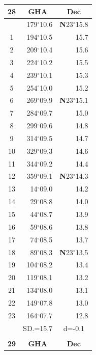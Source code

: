 \documentclass[10pt, a4paper]{report}
\begin{document}
\begin{scriptsize}
\begin{tabular*}{0.2\textwidth}[t]{@{\extracolsep{\fill}}|c|rr|}
\hline
\multicolumn{1}{|c|}{\rule{0pt}{2.6ex}\textbf{28}} & \multicolumn{1}{c}{\textbf{GHA}} & \multicolumn{1}{c|}{\textbf{Dec}}\\
\hline\rule{0pt}{2.6ex}\noindent
0 & 179$^\circ$10.6 & \textbf{N}23$^\circ$15.8\\
1 & 194$^\circ$10.5 & 15.7\\
2 & 209$^\circ$10.4 & 15.6\\
3 & 224$^\circ$10.2 & \raisebox{0.24ex}{\boldmath$\cdot$~\boldmath$\cdot$~~}15.5\\
4 & 239$^\circ$10.1 & 15.3\\
5 & 254$^\circ$10.0 & 15.2\\[2Pt]
6 & 269$^\circ$09.9 & \textbf{N}23$^\circ$15.1\\
7 & 284$^\circ$09.7 & 15.0\\
8 & 299$^\circ$09.6 & 14.8\\
9 & 314$^\circ$09.5 & \raisebox{0.24ex}{\boldmath$\cdot$~\boldmath$\cdot$~~}14.7\\
10 & 329$^\circ$09.3 & 14.6\\
11 & 344$^\circ$09.2 & 14.4\\[2Pt]
12 & 359$^\circ$09.1 & \textbf{N}23$^\circ$14.3\\
13 & 14$^\circ$09.0 & 14.2\\
14 & 29$^\circ$08.8 & 14.0\\
15 & 44$^\circ$08.7 & \raisebox{0.24ex}{\boldmath$\cdot$~\boldmath$\cdot$~~}13.9\\
16 & 59$^\circ$08.6 & 13.8\\
17 & 74$^\circ$08.5 & 13.7\\[2Pt]
18 & 89$^\circ$08.3 & \textbf{N}23$^\circ$13.5\\
19 & 104$^\circ$08.2 & 13.4\\
20 & 119$^\circ$08.1 & 13.2\\
21 & 134$^\circ$08.0 & \raisebox{0.24ex}{\boldmath$\cdot$~\boldmath$\cdot$~~}13.1\\
22 & 149$^\circ$07.8 & 13.0\\
23 & 164$^\circ$07.7 & 12.8\\
\hline
\rule{0pt}{2.4ex} & \multicolumn{1}{c}{SD.=15.7} & \multicolumn{1}{c|}{d=-0.1}\\
\hline
\multicolumn{1}{c}{}\\[-0.5ex]\hline
\multicolumn{1}{|c|}{\rule{0pt}{2.6ex}\textbf{29}} & \multicolumn{1}{c}{\textbf{GHA}} & \multicolumn{1}{c|}{\textbf{Dec}}\\

\end{tabular*}
\end{scriptsize}
\end{document}
